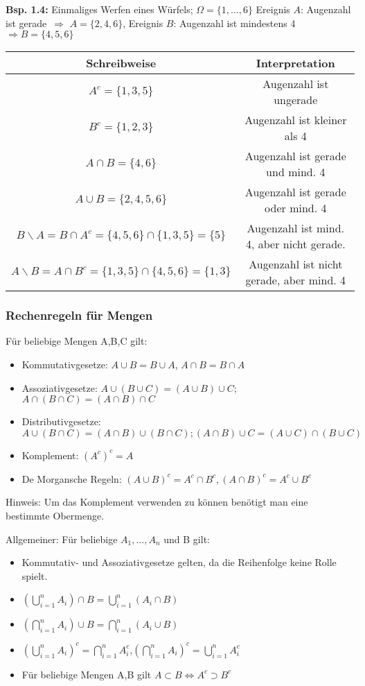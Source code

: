 \documentclass[a4paper,11pt]{article}
\begin{document}
\vspace{6pt}
\noindent\textbf{Bsp. 1.4:} Einmaliges Werfen eines Würfels; $\Omega = \{1,\dots,6\}$
\newline Ereignis $A$: \glqq Augenzahl ist gerade\grqq\ $\Rightarrow$ $A=\{2,4,6\}$, Ereignis $B$: \glqq Augenzahl ist mindestens 4\grqq\ $\Rightarrow B=\{4,5,6\}$
\newline\noindent\begin{tabular}{c|c}
Schreibweise & Interpretation\\
\hline
$A^c = \{1,3,5\}$ & Augenzahl ist ungerade\\
$B^c = \{1,2,3\}$ & Augenzahl ist kleiner als 4\\
$A\cap B = \{4,6\}$ & Augenzahl ist gerade und mind. 4\\
$A\cup B = \{2,4,5,6\}$ & Augenzahl ist gerade oder mind. 4\\
$B\backslash A = B\cap A^c = \{4,5,6\}\cap\{1,3,5\}=\{5\}$ & Augenzahl ist mind. 4, aber nicht gerade.\\
$A\backslash B = A\cap B^c = \{1,3,5\}\cap\{4,5,6\}=\{1,3\}$ & Augenzahl ist nicht gerade, aber mind. 4\\
\end{tabular}

\subsubsection{Rechenregeln für Mengen}
\noindent Für beliebige Mengen A,B,C gilt:
\begin{itemize}
    \item Kommutativgesetze: $A\cup B = B\cup A$, $A\cap B = B\cap A$
    \item Assoziativgesetze: $A\cup(B\cup C)=(A\cup B)\cup C$; $A\cap(B\cap C)=(A\cap B)\cap C$
    \item Distributivgesetze: $A\cup(B\cap C) = (A\cap B) \cup (B\cap C); (A\cap B)\cup C = (A\cup C)\cap (B\cup C)$
    \item Komplement: $(A^c)^c = A$
    \item De Morgansche Regeln: $(A\cup B)^c = A^c\cap B^c, (A\cap B)^c = A^c\cup B^c$
\end{itemize}
Hinweis: Um das Komplement verwenden zu können benötigt man eine bestimmte Obermenge.

\vspace{6pt}
\noindent Allgemeiner: Für beliebige $A_1,\dots,A_n$ und B gilt:
\begin{itemize}
    \item Kommutativ- und Assoziativgesetze gelten, da die Reihenfolge keine Rolle spielt.
    \item $(\bigcup_{i=1}^{n}A_i)\cap B = \bigcup_{i=1}^{n}(A_i\cap B)$
    \item $(\bigcap_{i=1}^{n}A_i)\cup B = \bigcap_{i=1}^{n}(A_i\cup B)$
    \item $(\bigcup_{i=1}^{n}A_i)^c = \bigcap_{i=1}^{n}A_i^c$,$(\bigcap_{i=1}^{n}A_i)^c = \bigcup_{i=1}^{n}A_i^c$
    \item Für beliebige Mengen A,B gilt $A\subset B \Leftrightarrow A^c\supset B^c$
\end{itemize}
\end{document}
